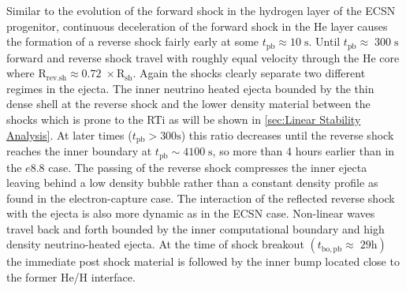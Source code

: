 \documentclass[fleqn,usenatbib]{mnras}
\newcommand{\nickel}{$\mathrm{Ni^{56}}$\xspace}
\begin{document}
Similar to the evolution of the forward shock in the hydrogen layer of the ECSN progenitor, continuous deceleration of the forward shock in the He layer causes the formation of a reverse shock fairly early at some $t_{\mathrm{pb}}\approx 10\;\mathrm{s}$. Until $t_{\mathrm{pb}}\approx \; 300\;\mathrm{s}$ forward and reverse shock travel with roughly equal velocity through the He core where $\mathrm{R_{rev.sh}\approx 0.72\;\times R_{sh}}$. 
Again the shocks clearly separate two different regimes in the ejecta. The inner neutrino heated ejecta bounded by the thin dense shell at the reverse shock and the lower density material between the shocks which is prone to the RTi as will be shown in \autoref{sec:Linear Stability Analysis}.
%
At later times ($t_{\mathrm{pb}} > 300 \mathrm{s}$) this ratio decreases until the reverse shock reaches the inner boundary at $t_{\mathrm{pb}}\sim 4100\;\mathrm{s}$, so more than 4 hours earlier than in the $e8.8$ case. The passing of the reverse shock compresses the inner ejecta leaving behind a low density bubble rather than a constant density profile as found in the electron-capture case.
The interaction of the reflected reverse shock with the ejecta is also more dynamic as in the ECSN case. Non-linear waves travel back and forth bounded by the inner computational boundary and high density neutrino-heated ejecta. At the time of shock breakout $(t_{\mathrm{bo,pb}}\approx\; 29\mathrm{h})$ the immediate post shock material is followed by the inner bump located close to the former He/H interface. %

\end{document}
